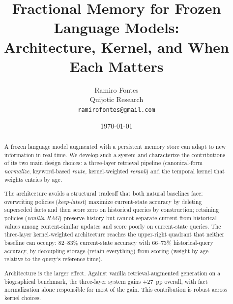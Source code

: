 \documentclass[11pt]{article}
\title{Fractional Memory for Frozen Language Models:\\
  Architecture, Kernel, and When Each Matters}
\author{Ramiro Fontes\\
  Quijotic Research\\
  \texttt{ramirofontes@gmail.com}}
\date{\today}
\theoremstyle{plain}
\theoremstyle{definition}
\begin{document}
\maketitle

\begin{abstract}
A frozen language model augmented with a persistent
memory store can adapt to new information in real time.
We develop such a system and characterize the
contributions of its two main design choices: a
three-layer retrieval pipeline (canonical-form
\emph{normalize}, keyword-based \emph{route},
kernel-weighted \emph{rerank}) and the temporal
kernel that weights entries by age.

The architecture avoids a structural tradeoff that
both natural baselines face: overwriting policies
(\emph{keep-latest}) maximize current-state
accuracy by deleting superseded facts and then
score zero on historical queries by construction;
retaining policies (\emph{vanilla RAG}) preserve
history but cannot separate current from historical
values among content-similar updates and score
poorly on current-state queries.  The three-layer
kernel-weighted architecture reaches the
upper-right quadrant that neither baseline can
occupy: $82$--$83\%$ current-state accuracy with
$66$--$73\%$ historical-query accuracy, by
decoupling storage (retain everything) from
scoring (weight by age relative to the query's
reference time).

Architecture is the larger effect.  Against
vanilla retrieval-augmented generation on a
biographical benchmark, the three-layer system gains
$+27$~pp overall, with fact normalization alone
responsible for most of the gain.  This contribution
is robust across kernel choices.


\end{abstract}
\end{document}
